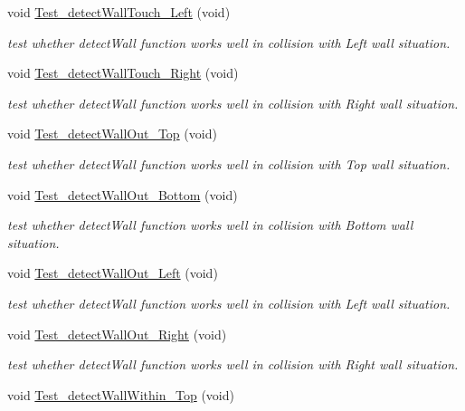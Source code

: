 \begin{DoxyCompactItemize}
void \hyperlink{classObjectTests_ab1694e1c3b2e7b0754ec29acb9b97837}{Test\-\_\-detect\-Wall\-Touch\-\_\-\-Left} (void)
\begin{DoxyCompactList}\small\item\em test whether detect\-Wall function works well in collision with Left wall situation. \end{DoxyCompactList}\item 
void \hyperlink{classObjectTests_aa4cac76075e2988fa0c81c56a5ea8996}{Test\-\_\-detect\-Wall\-Touch\-\_\-\-Right} (void)
\begin{DoxyCompactList}\small\item\em test whether detect\-Wall function works well in collision with Right wall situation. \end{DoxyCompactList}\item 
void \hyperlink{classObjectTests_a0eeb781ec4b01084388c7b75749a0da0}{Test\-\_\-detect\-Wall\-Out\-\_\-\-Top} (void)
\begin{DoxyCompactList}\small\item\em test whether detect\-Wall function works well in collision with Top wall situation. \end{DoxyCompactList}\item 
void \hyperlink{classObjectTests_acea24c799dff75ee75284bfabe5d4c68}{Test\-\_\-detect\-Wall\-Out\-\_\-\-Bottom} (void)
\begin{DoxyCompactList}\small\item\em test whether detect\-Wall function works well in collision with Bottom wall situation. \end{DoxyCompactList}\item 
void \hyperlink{classObjectTests_a1b04be05c8764c131f102cbb5e6f7b84}{Test\-\_\-detect\-Wall\-Out\-\_\-\-Left} (void)
\begin{DoxyCompactList}\small\item\em test whether detect\-Wall function works well in collision with Left wall situation. \end{DoxyCompactList}\item 
void \hyperlink{classObjectTests_a1c05b1d58719770234f733435e4e9f46}{Test\-\_\-detect\-Wall\-Out\-\_\-\-Right} (void)
\begin{DoxyCompactList}\small\item\em test whether detect\-Wall function works well in collision with Right wall situation. \end{DoxyCompactList}\item 
void \hyperlink{classObjectTests_a713c431caa4e88bf0ac4de61119a0eb5}{Test\-\_\-detect\-Wall\-Within\-\_\-\-Top} (void)

\end{DoxyCompactItemize}
